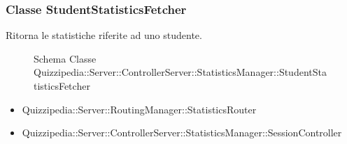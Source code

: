 \subsubsection{Classe StudentStatisticsFetcher}
Ritorna le statistiche riferite ad uno studente.
\begin{figure}[H]
\centering
\noindent{}
\caption[Schema Classe StudentStatisticsFetcher]{Schema Classe Quizzipedia::Server::ControllerServer::StatisticsManager::StudentStatisticsFetcher}
\end{figure}
\begin{itemize}
\item Quizzipedia::Server::RoutingManager::StatisticsRouter
\end{itemize}
\begin{itemize}
\item Quizzipedia::Server::ControllerServer::StatisticsManager::SessionController
\end{itemize}
